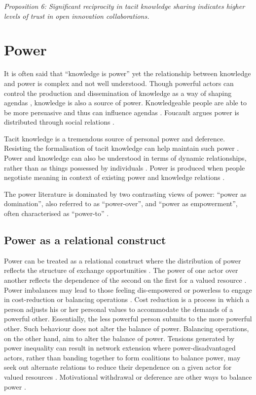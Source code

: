 \emph{Proposition 6: Significant reciprocity in tacit knowledge sharing indicates higher levels of trust in open innovation collaborations.}


\section{Power}
 
It is often said that \enquote{knowledge is power} yet the relationship between knowledge and power is complex and not well understood. Though powerful actors can control the production and dissemination of knowledge as a way of shaping agendas \citep{gaventa2007power}, knowledge is also a source of power. Knowledgeable people are able to be more persuasive and thus can influence agendas \citep{hart1997power}. Foucault argues power is distributed through social relations \citep{barker2016cultural}. 

Tacit knowledge is a tremendous source of personal power and deference. Resisting the formalisation of tacit knowledge can help maintain such power \citep{schultze2004knowing}. Power and knowledge can also be understood in terms of dynamic relationships, rather than as things possessed by individuals \citep{rouse2005power}. Power is produced when people negotiate meaning in context of existing power and knowledge relations \citep{heizmann2015power}. \medskip

The power literature is dominated by two contrasting views of power: \enquote{power as domination}, also referred to as \enquote{power-over}, and \enquote{power as empowerment}, often characterised as \enquote{power-to} \citep{haugaard2012rethinking}. \medskip

\subsection{Power as a relational construct}

Power can be treated as a relational construct where the distribution of power reflects the structure of exchange opportunities \citep{blau1964exchange,reagans2008knowledge,bonacich2009structural}. The power of one actor over another reflects the dependence of the second on the first for a valued resource \citep{emerson1962power}. Power imbalances may lead to those feeling dis-empowered or powerless to engage in cost-reduction or balancing operations \citep{emerson1962power}. Cost reduction is a process in which a person adjusts his or her personal values to accommodate the demands of a powerful other. Essentially, the less powerful person submits to the more powerful other. Such behaviour does not alter the balance of power. Balancing operations, on the other hand, aim to alter the balance of power. Tensions generated by power inequality can result in network extension where power-disadvantaged actors, rather than banding together to form coalitions to balance power, may seek out alternate relations to reduce their dependence on a given actor for valued resources \citep{cook2013social}. Motivational withdrawal or deference are other ways to balance power \citep{emerson1962power}. \medskip

